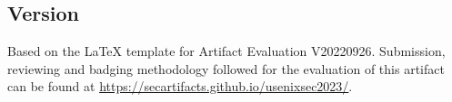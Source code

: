 



\subsection{Version}
Based on the LaTeX template for Artifact Evaluation V20220926. Submission,
reviewing and badging methodology followed for the evaluation of this artifact
can be found at \url{https://secartifacts.github.io/usenixsec2023/}.